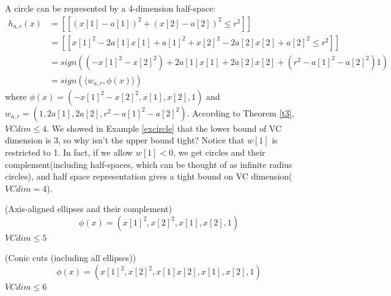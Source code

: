 \documentclass{article}
\begin{document}
\begin{example}
	A circle can be represented by a 4-dimension half-space:
	\begin{displaymath}
	\begin{aligned}
  		h_{a,r}(x){} & =[[(x[1]-a[1])^2+(x[2]-a[2])^2\leq r^2]] \\
  		& =[[x[1]^2-2a[1]x[1]+a[1]^2+x[2]^2-2a[2]x[2]+a[2]^2\leq r^2]] \\
  		& =sign((-x[1]^2-x[2]^2)+2a[1]x[1]+2a[2]x[2]+(r^2-a[1]^2-a[2]^2)1) \\
  		& =sign(\langle w_{a,r}, \phi(x)\rangle)
  	\end{aligned}
	\end{displaymath}
	where $\phi(x)=(-x[1]^2-x[2]^2, x[1], x[2], 1)$ and $w_{a,r}=(1,2a[1], 2a[2], r^2-a[1]^2-a[2]^2)$. According to Theorem \ref{t3}, $VCdim\leq 4$. We showed in Example \ref{excircle} that the lower bound of VC dimension is 3, so why isn't the upper bound tight? Notice that $w[1]$ is restricted to 1. In fact, if we allow $w[1]<0$, we get circles and their complement(including half-spaces, which can be thought of as infinite radius circles), and half space representation gives a tight bound on VC dimension($VCdim=4$).
\end{example}

\begin{example}(Axis-aligned ellipses and their complement)
	\begin{displaymath}
  		\phi(x)=(x[1]^2, x[2]^2, x[1], x[2], 1)
	\end{displaymath}
	$VCdim\leq 5$
\end{example}

\begin{example}(Conic cuts (including all ellipses))
	\begin{displaymath}
  		\phi(x)=(x[1]^2, x[2]^2, x[1]x[2], x[1], x[2], 1)
	\end{displaymath}
	$VCdim\leq 6$
\end{example}
\end{document}
